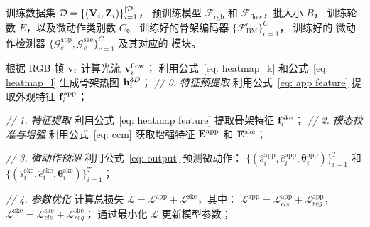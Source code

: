 \begin{algorithm}[t]
    \renewcommand{\algorithmicrequire}{\textbf{输入：}}
    \renewcommand{\algorithmicensure}{\textbf{输出：}}
    
    \caption{\sexyname 的训练流程}\label{alg:pipeline}
    \begin{algorithmic}[1] %
    \REQUIRE 
        训练数据集 \( \mathcal{D} = \{(\mathbf{V}_i, \mathbf{Z}_i)\}_{i=1}^{|\mathcal{D}|} \)，
        预训练模型 \( \mathcal{F}_{\text{rgb}} \) 和 \( \mathcal{F}_{\text{flow}} \)，批大小 \( B \)，
        训练轮\\数 \( E \)，以及微动作类别数 \( C \)。
    \ENSURE 
        训练好的骨架编码器 \( \{\mathcal{F}_{\text{BM}}^c \}_{c=1}^C  \)，
        训练好的 \sexyname 微动作检测器 \( \{\mathcal{G}_c^{\text{app}}, \mathcal{G}_c^{\text{ske}}\}_{c=1}^C \) 及其对应的 \crossblockshort 模块。

    \STATE 根据 RGB 帧 \( \mathbf{v}_i \) 计算光流 \( \mathbf{v}_i^{\text{flow}} \)；
    \STATE 利用公式~\ref{eq: heatmap_k} 和公式~\ref{eq: heatmap_l} 生成骨架热图 \( \mathbf{h}_i^{3D} \)；
    \STATE \textit{// 0. 特征预提取}
    \STATE 利用公式~\ref{eq: app feature} 提取外观特征 \( \mathbf{f}^{\text{app}}_i \)；

                \STATE \textit{// 1. 特征提取}
                \STATE 利用公式~\ref{eq: heatmap feature} 提取骨架特征 \( \mathbf{f}^{\text{ske}}_i \)；    
                \STATE \textit{// 2. 模态校准与增强}
                \STATE 利用公式~\ref{eq: ccm} 获取增强特征 \( \mathbf{E}^{\text{app}}\) 和 \( \mathbf{E}^{\text{ske}}\)；
                
                \STATE \textit{// 3. 微动作预测}
                \STATE 利用公式~\ref{eq: output} 预测微动作：
                \STATE \quad \( \{(\hat{s}_i^{\text{app}}, \hat{e}_i^{\text{app}},  \mathbf{\theta}_i^{\text{app}})\}_{i=1}^T\) 和 \(\{(\hat{s}_i^{\text{ske}}, \hat{e}_i^{\text{ske}}, \mathbf{\theta}_i^{\text{ske}})\}_{i=1}^T\)；
                
                \STATE \textit{// 4. 参数优化}
                \STATE 计算总损失 \( \mathcal{L} = \mathcal{L}^\text{app} + \mathcal{L}^\text{ske} \)，其中：
                \STATE \quad \( \mathcal{L}^\text{app} = \mathcal{L}_{cls}^{\text{app}} + \mathcal{L}_{reg}^{\text{app}} \)，
                \( \mathcal{L}^\text{ske} = \mathcal{L}_{cls}^{\text{ske}} + \mathcal{L}_{reg}^{\text{ske}} \)；
                \STATE 通过最小化 \( \mathcal{L} \) 更新模型参数；
            \ENDFOR
        \ENDFOR
    \ENDFOR
    \end{algorithmic}
\end{algorithm}

